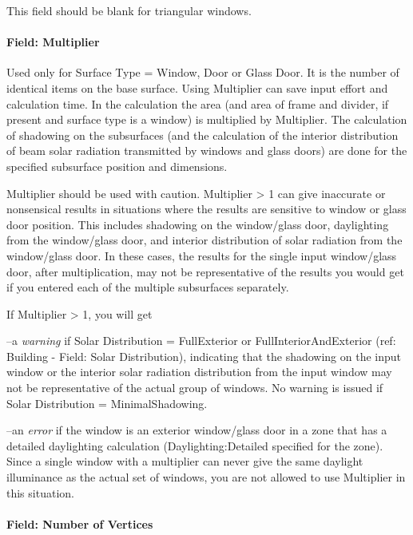 This field should be blank for triangular windows.

\paragraph{Field: Multiplier}\label{field-multiplier-7}

Used only for Surface Type = Window, Door or Glass Door. It is the number of identical items on the base surface. Using Multiplier can save input effort and calculation time. In the calculation the area (and area of frame and divider, if present and surface type is a window) is multiplied by Multiplier. The calculation of shadowing on the subsurfaces (and the calculation of the interior distribution of beam solar radiation transmitted by windows and glass doors) are done for the specified subsurface position and dimensions.

Multiplier should be used with caution. Multiplier \textgreater{} 1 can give inaccurate or nonsensical results in situations where the results are sensitive to window or glass door position. This includes shadowing on the window/glass door, daylighting from the window/glass door, and interior distribution of solar radiation from the window/glass door. In these cases, the results for the single input window/glass door, after multiplication, may not be representative of the results you would get if you entered each of the multiple subsurfaces separately.

If Multiplier \textgreater{} 1, you will get

--a \emph{warning} if Solar Distribution = FullExterior or FullInteriorAndExterior (ref: Building - Field: Solar Distribution), indicating that the shadowing on the input window or the interior solar radiation distribution from the input window may not be representative of the actual group of windows. No warning is issued if Solar Distribution = MinimalShadowing.

--an \emph{error} if the window is an exterior window/glass door in a zone that has a detailed daylighting calculation (Daylighting:Detailed specified for the zone). Since a single window with a multiplier can never give the same daylight illuminance as the actual set of windows, you are not allowed to use Multiplier in this situation.

\paragraph{Field: Number of Vertices}\label{field-number-of-vertices-4}

